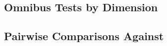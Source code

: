 \subsection{Omnibus Tests by Dimension}\label{sec:supp:cec2020:omnibus}

%

\begin{table}[htbp]
  \centering
  \caption{%
  }\label{tab:supp:cec2020:omnibus}
\end{table}

\subsection{Pairwise Comparisons Against \dtgsk{}}\label{sec:supp:cec2020:pairwise}


\begin{table}[htbp]
  \centering
  \caption{%
  }\label{tab:supp:cec2020:pairwise}
\end{table}

\begin{table}[htbp]
  \centering
  \caption{%
  }\label{tab:supp:cec2020:pairwise-run}
\end{table}

